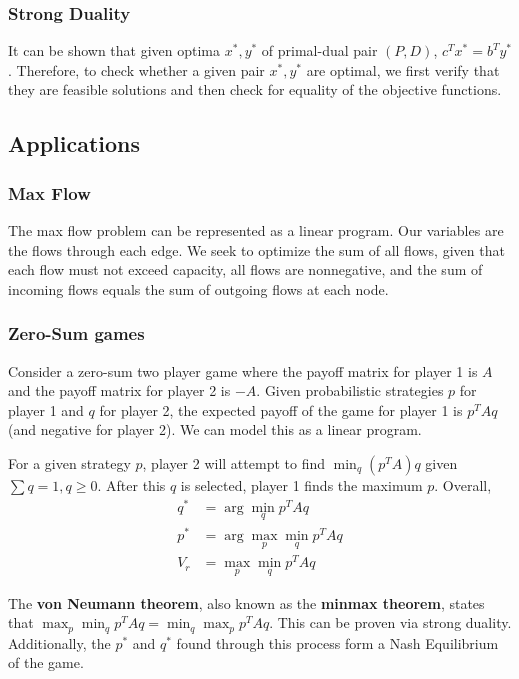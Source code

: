 \documentclass[10pt]{article}
\begin{document}
\subsubsection*{Strong Duality}
It can be shown that given optima $x^*, y^*$ of primal-dual pair $(P, D)$, $c^T x^* = b^T y^*$. Therefore, to check whether a given pair $x^*, y^*$ are optimal, we first verify that they are feasible solutions and then check for equality of the objective functions.

\subsection*{Applications}
\subsubsection*{Max Flow}
The max flow problem can be represented as a linear program. Our variables are the flows through each edge. We seek to optimize the sum of all flows, given that each flow must not exceed capacity, all flows are nonnegative, and the sum of incoming flows equals the sum of outgoing flows at each node.

\subsubsection*{Zero-Sum games}
Consider a zero-sum two player game where the payoff matrix for player 1 is $A$ and the payoff matrix for player 2 is $-A$. Given probabilistic strategies $p$ for player 1 and $q$ for player 2, the expected payoff of the game for player 1 is $p^T A q$ (and negative for player 2). We can model this as a linear program.

For a given strategy $p$, player 2 will attempt to find $\min_q (p^T A) q$ given $\sum q = 1, q \geq 0$. After this $q$ is selected, player 1 finds the maximum $p$. Overall,
\begin{align*}
    q^* &= \arg\min_q p^T A q\\
    p^* &= \arg\max_p \min_q p^T A q\\
    V_r &= \max_p \min_q p^T A q
\end{align*}

The \textbf{von Neumann theorem}, also known as the \textbf{minmax theorem}, states that $\max_p \min_q p^T A q = \min_q \max_p p^T A q$. This can be proven via strong duality. Additionally, the $p^*$ and $q^*$ found through this process form a Nash Equilibrium of the game.
\end{document}
